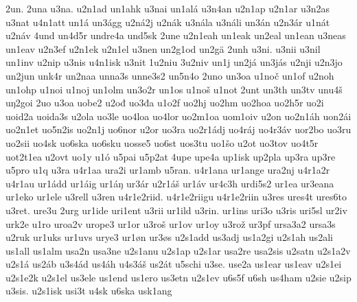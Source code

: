 {    2un.
    2una
    u3na.
    u2n1ad
    un1ahk
    u3nai
    un1alá
    u3n4an
    u2n1ap
    u2n1ar
    u3n2as
    u3nat
    u4n1att
    un1á
    un3ágg
    u2ná2j
    u2nák
    u3nála
    u3náli
    un3án
    u2n3ár
    u1nát
    u2náv
    4und
    un4d5r
    undre4a
    und5sk
    2une
    u2n1eah
    un1eak
    un2eal
    un1ean
    u3neas
    un1eav
    u2n3ef
    u2n1ek
    u2n1el
    u3nen
    un2g1od
    un2gä
    2unh
    u3ni.
    u3nii
    u3nil
    un1inv
    u2nip
    u3nis
    u4n1isk
    u3nit
    1u2niu
    3u2niv
    un1j
    un2já
    un3jás
    u2nji
    u2n3jo
    un2jun
    unk4r
    un2naa
    unna3s
    unne3s2
    un5n4o
    2uno
    un3oa
    u1noč
    un1of
    u2noh
    un1ohp
    u1noi
    u1noj
    un1olm
    un3o2r
    un1os
    u1noš
    u1not
    2unt
    un3th
    un3tv
    unu4š
    uŋ2goi
    2uo
    u3oa
    uobe2
    u2ođ
    uo3đa
    u1o2f
    uo2hj
    uo2hm
    uo2hoa
    uo2h5r
    uo2i
    uoid2a
    uoida3s
    u2ola
    uo3le
    uo4loa
    uo4lor
    uo2m1oa
    uom1oiv
    u2on
    uo2n1áh
    uon2ái
    uo2n1et
    uo5n2is
    uo2n1j
    uo6nor
    u2or
    uo3ra
    uo2r1ádj
    uo4ráj
    uo4r3áv
    uor2bo
    uo3ru
    uo2sii
    uo4sk
    uo6ska
    uo6sku
    uosse5
    uo6st
    uos3tu
    uo1šo
    u2ot
    uo3tov
    uo4t5r
    uot2t1ea
    u2ovt
    uo1y
    u1ó
    u5pai
    u5p2at
    4upe
    upe4a
    up1isk
    up2pla
    up3ra
    up3re
    u5pro
    u1q
    u3ra
    u4r1aa
    ura2i
    ur1amb
    u5ran.
    u4r1ana
    ur1ange
    ura2nj
    u4r1a2r
    u4r1au
    ur1ádd
    ur1áig
    ur1áŋ
    ur3ár
    u2r1áš
    ur1áv
    ur4c3h
    urdi5s2
    ur1ea
    ur3eana
    ur1eko
    ur1ele
    u3rell
    u3ren
    u4r1e2riid.
    u4r1e2riigu
    u4r1e2riin
    u3res
    ures4t
    ures6to
    u3ret.
    ure3u
    2urg
    ur1ide
    uri1ent
    u3rii
    ur1ild
    u3rin.
    ur1ins
    uri3o
    u3ris
    uri5sl
    ur2iv
    urk2e
    u1ro
    uroa2v
    urope3
    ur1or
    u3roš
    ur1ov
    ur1oy
    u3rož
    ur3pf
    ursa3a2
    ursa3s
    u2ruk
    ur1uks
    ur1uvs
    urye3
    ur1øn
    ur3øs
    u2s1add
    us3adj
    us1a2gi
    u2s1ah
    us2ali
    us1all
    us1alm
    usa2n
    usa3ne
    u2s1anu
    u2s1ap
    u2s1ar
    usa2re
    usa2sis
    u2satn
    u2s1a2v
    u2s1á
    us2áb
    u3s4ád
    us4áh
    u4s3áš
    us2át
    u5schi
    u3se.
    use2a
    us1ear
    us1eav
    u2s1ei
    u2s1e2k
    u2s1el
    us3ele
    us1end
    us1ero
    us3etn
    u2s1ev
    u6s5f
    u6sh
    us4ham
    u2sie
    u2sip
    u3sis.
    u2s1isk
    usi3t
    u4sk
    u6ska
    usk1ang
}
